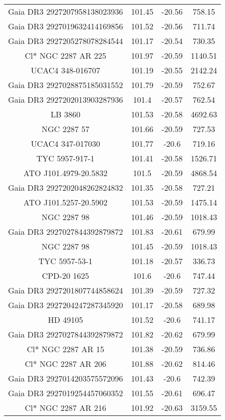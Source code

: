\begin{table}
\begin{tabular}{cccc}
Gaia DR3 2927207958138023936 & 101.45 & -20.56 & 758.15 \\
Gaia DR3 2927019632414169856 & 101.52 & -20.56 & 711.74 \\
Gaia DR3 2927205278078284544 & 101.17 & -20.54 & 730.35 \\
Cl* NGC 2287     AR     225 & 101.97 & -20.59 & 1140.51 \\
UCAC4 348-016707 & 101.19 & -20.55 & 2142.24 \\
Gaia DR3 2927028875185031552 & 101.79 & -20.59 & 752.67 \\
Gaia DR3 2927202013903287936 & 101.4 & -20.57 & 762.54 \\
LB  3860 & 101.53 & -20.58 & 4692.63 \\
NGC  2287    57 & 101.66 & -20.59 & 727.53 \\
UCAC4 347-017030 & 101.77 & -20.6 & 719.16 \\
TYC 5957-917-1 & 101.41 & -20.58 & 1526.71 \\
ATO J101.4979-20.5832 & 101.5 & -20.59 & 4868.54 \\
Gaia DR3 2927202048262824832 & 101.35 & -20.58 & 727.21 \\
ATO J101.5257-20.5902 & 101.53 & -20.59 & 1475.14 \\
NGC  2287    98 & 101.46 & -20.59 & 1018.43 \\
Gaia DR3 2927027844392879872 & 101.83 & -20.61 & 679.99 \\
NGC  2287    98 & 101.45 & -20.59 & 1018.43 \\
TYC 5957-53-1 & 101.18 & -20.57 & 336.73 \\
CPD-20  1625 & 101.6 & -20.6 & 747.44 \\
Gaia DR3 2927201807744858624 & 101.39 & -20.59 & 727.32 \\
Gaia DR3 2927204247287345920 & 101.17 & -20.58 & 689.98 \\
HD  49105 & 101.52 & -20.6 & 741.17 \\
Gaia DR3 2927027844392879872 & 101.82 & -20.62 & 679.99 \\
Cl* NGC 2287     AR      15 & 101.38 & -20.59 & 736.86 \\
Cl* NGC 2287     AR     206 & 101.88 & -20.62 & 814.46 \\
Gaia DR3 2927014203575572096 & 101.43 & -20.6 & 742.39 \\
Gaia DR3 2927019254457060352 & 101.55 & -20.61 & 696.47 \\
Cl* NGC 2287     AR     216 & 101.92 & -20.63 & 3159.55 \\

\end{tabular}
\end{table}
